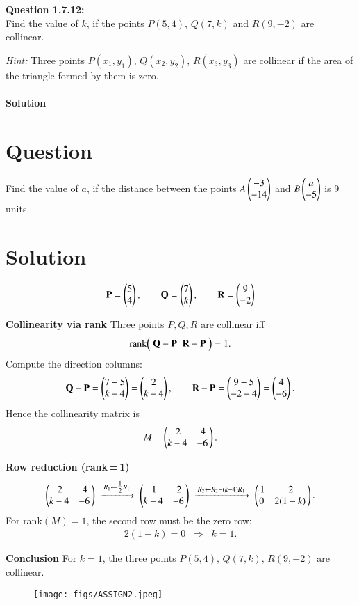 \documentclass[journal]{IEEEtran}
\begin{document}

\textbf{Question 1.7.12:} \\
\textbf{} Find the value of $k$, if the points $P(5,4)$, $Q(7,k)$ and $R(9,-2)$ are collinear. 

\textit{Hint:} Three points $P(x_1,y_1)$, $Q(x_2,y_2)$, $R(x_3,y_3)$ are collinear if the area of the triangle formed by them is zero.\\
\\

\textbf{Solution}



\section*{Question}
Find the value of $a$, if the distance between the points 
$A\begin{pmatrix}-3\\-14\end{pmatrix}$ and $B\begin{pmatrix}a\\-5\end{pmatrix}$ is $9$ units.

\section*{Solution}
\begin{align}
\mathbf P=\begin{pmatrix}5\\4\end{pmatrix},\qquad
\mathbf Q=\begin{pmatrix}7\\k\end{pmatrix},\qquad
\mathbf R=\begin{pmatrix}9\\-2\end{pmatrix}
\end{align}

 \textbf{Collinearity via rank}
Three points \(P,Q,R\) are collinear iff
\begin{align}
\operatorname{rank}\!\begin{pmatrix}\; \mathbf Q-\mathbf P \;\; \mathbf R-\mathbf P \;\end{pmatrix}=1.
\end{align}
Compute the direction columns:
\begin{align}
\mathbf Q-\mathbf P=\begin{pmatrix}7-5\\k-4\end{pmatrix}=\begin{pmatrix}2\\k-4\end{pmatrix},\qquad
\mathbf R-\mathbf P=\begin{pmatrix}9-5\\-2-4\end{pmatrix}=\begin{pmatrix}4\\-6\end{pmatrix}.
\end{align}
Hence the collinearity matrix is
\begin{align}
M=\begin{pmatrix}\,2 & 4\\ k-4 & -6\,\end{pmatrix}.
\end{align}

\textbf{Row reduction (rank\,=\,1)}
\begin{align}
\begin{pmatrix}\,2 & 4\\ k-4 & -6\,\end{pmatrix}
\;\xrightarrow{\,R_1\leftarrow \tfrac12 R_1\,}\;
\begin{pmatrix}\,1 & 2\\k-4 & -6\,\end{pmatrix}
\;\xrightarrow{\,R_2\leftarrow R_2-(k-4)R_1\,}\;
\begin{pmatrix}\,1 & 2\\0 & 2(1-k)\,\end{pmatrix}.
\end{align}
For rank\((M)=1\), the second row must be the zero row:
\begin{align}
2(1-k)=0 \;\;\Rightarrow\;\; k=1.
\end{align}

\textbf{Conclusion}
For \(k=\boxed{1}\), the three points \(P(5,4),\,Q(7,k),\,R(9,-2)\) are collinear.

\newpage
\begin{figure}
    \centering
\texttt{[image: figs/ASSIGN2.jpeg]}
    \caption{}
    \label{fig:placeholder}
\end{figure}
\end{document}

